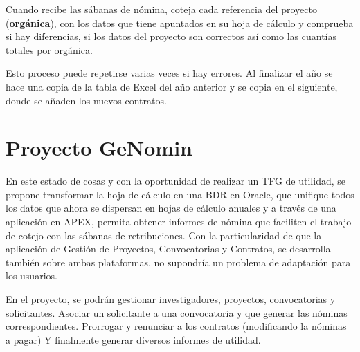 Cuando recibe las sábanas de nómina, coteja cada referencia del proyecto (\textbf{\textbf{orgánica}}), con los datos que tiene apuntados en su hoja de cálculo y comprueba si hay diferencias, si los datos del proyecto son correctos así como las cuantías totales por orgánica.

Esto proceso puede repetirse varias veces si hay errores. Al finalizar el año se hace una copia de la tabla de Excel del año anterior y se copia en el siguiente, donde se añaden los nuevos contratos.

\section{Proyecto GeNomin}

En este estado de cosas y con la oportunidad de realizar un \acrshort{TFG} de utilidad, se propone transformar la hoja de cálculo en una \acrshort{BDR} en Oracle, que unifique todos los datos que ahora se dispersan en hojas de cálculo anuales y a través de una aplicación en \acrshort{APEX}, permita obtener informes de nómina que faciliten el trabajo de cotejo con las sábanas de retribuciones. Con la particularidad de que la aplicación de Gestión de Proyectos, Convocatorias y Contratos, se desarrolla también sobre ambas plataformas, no supondría un problema de adaptación para los usuarios.

En el proyecto, se podrán gestionar investigadores, proyectos, convocatorias y solicitantes. Asociar un solicitante a una convocatoria y que generar las nóminas correspondientes. Prorrogar y renunciar a los contratos (modificando la nóminas a pagar) Y finalmente generar diversos informes de utilidad.